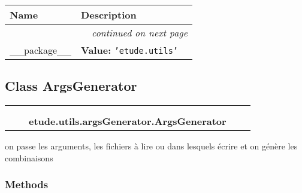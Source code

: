     \vspace{-1cm}
\hspace{\varindent}\begin{longtable}{|p{\varnamewidth}|p{\vardescrwidth}|l}
\cline{1-2}
\cline{1-2} \centering \textbf{Name} & \centering \textbf{Description}& \\
\cline{1-2}
\endhead\cline{1-2}\multicolumn{3}{r}{\small\textit{continued on next page}}\\\endfoot\cline{1-2}
\endlastfoot\raggedright \_\-\_\-p\-a\-c\-k\-a\-g\-e\-\_\-\_\- & \raggedright \textbf{Value:} 
{\tt \texttt{'}\texttt{etude.utils}\texttt{'}}&\\
\cline{1-2}
\end{longtable}



\subsection{Class ArgsGenerator}

    \label{etude:utils:argsGenerator:ArgsGenerator}
\begin{tabular}{cccccc}
\multicolumn{2}{r}{\settowidth{\BCL}{object}\multirow{2}{\BCL}{object}}
&&
  \\\cline{3-3}
  &&\multicolumn{1}{c|}{}
&&
  \\
&&\multicolumn{2}{l}{\textbf{etude.utils.argsGenerator.ArgsGenerator}}
\end{tabular}

on passe les arguments, les fichiers à lire ou dans lesquels écrire et on 
génère les combinaisons



  \subsubsection{Methods}

